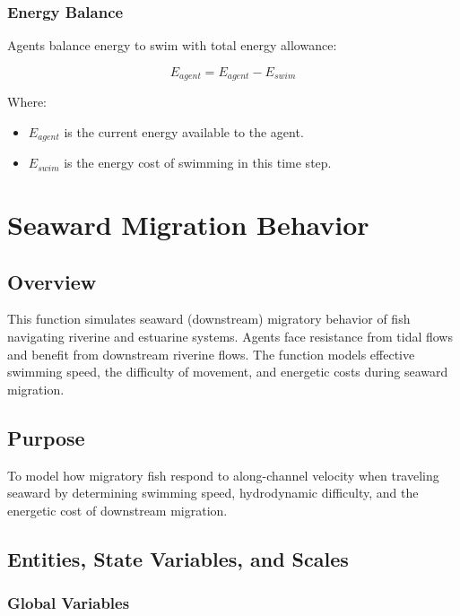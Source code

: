\documentclass[
]{book}
\providecommand{\tightlist}{%
  \setlength{\itemsep}{0pt}\setlength{\parskip}{0pt}}
\begin{document}
\subsection{Energy Balance}\label{energy-balance-1}

Agents balance energy to swim with total energy allowance:

\[ E_{agent} = E_{agent} - E_{swim} \]

Where:

\begin{itemize}
\tightlist
\item
  \(E_{agent}\) is the current energy available to the agent.
\item
  \(E_{swim}\) is the energy cost of swimming in this time step.
\end{itemize}

\chapter{Seaward Migration Behavior}\label{seaward-migration-behavior}

\section{Overview}\label{overview-4}

This function simulates seaward (downstream) migratory behavior of fish navigating riverine and estuarine systems. Agents face resistance from tidal flows and benefit from downstream riverine flows. The function models effective swimming speed, the difficulty of movement, and energetic costs during seaward migration.

\section{Purpose}\label{purpose-3}

To model how migratory fish respond to along-channel velocity when traveling seaward by determining swimming speed, hydrodynamic difficulty, and the energetic cost of downstream migration.

\section{Entities, State Variables, and Scales}\label{entities-state-variables-and-scales-3}

\subsection{Global Variables}\label{global-variables-2}
\end{document}
